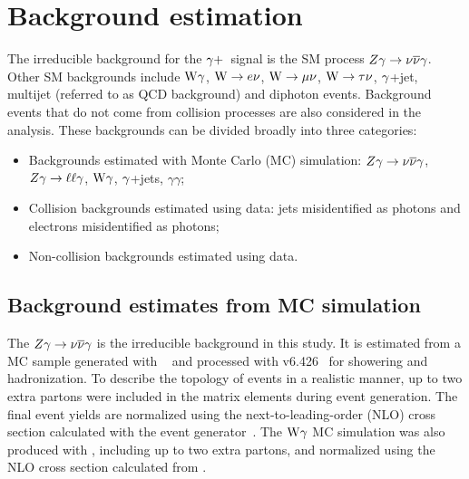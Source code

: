 \section{Background estimation}

   The irreducible background for the ${\gamma}+$\met\ signal is the SM process $Z{\gamma}\rightarrow\nu\overline{\nu}{\gamma}$. Other SM backgrounds include $\mathrm{W}{\gamma}$, $\mathrm{W}\rightarrow {e}\nu$, $\mathrm{W}\rightarrow \mu\nu$, $\mathrm{W}\rightarrow \tau\nu$, ${\gamma}$+jet, multijet (referred to as QCD background) and diphoton events. Background events that do not come from collision processes are also considered in the analysis. These backgrounds can be divided broadly into three categories: 

\begin{itemize}
 \item Backgrounds estimated with Monte Carlo (MC) simulation: $Z{\gamma}\rightarrow\nu\overline{\nu}{\gamma}$, $Z{\gamma}\rightarrow\ell\ell{\gamma}$, $\mathrm{W}{\gamma}$, ${\gamma}$+jets, $\gamma\gamma$;
 \item Collision backgrounds estimated using data: jets misidentified as photons and electrons misidentified as photons;
 \item Non-collision backgrounds estimated using data. %
\end{itemize}


\subsection{Background estimates from MC simulation}

   The $Z{\gamma}\rightarrow\nu\overline{\nu}{\gamma}$ is the irreducible background in this study. It is estimated from a MC sample generated with \MADGRAPH~\cite{Alwall:2011uj} and processed with \PYTHIA v6.426~\cite{Sjostrand:2006za} for showering and hadronization. To describe the topology of events in a realistic manner, up to two extra partons were included in the matrix elements during event generation. The final event yields are normalized using the next-to-leading-order (NLO) cross section calculated with the \MCFM event generator~\cite{MCFM}.  The $\mathrm{W}\gamma$ MC simulation was also produced with \MADGRAPH, including up to two extra partons, and normalized using the NLO cross section calculated from \MCFM. 

